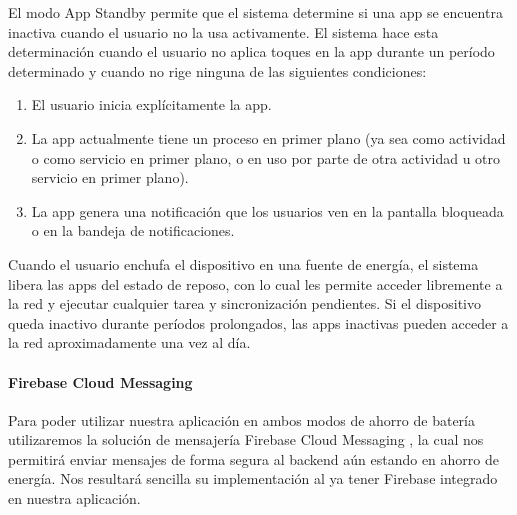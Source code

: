 El modo App Standby permite que el sistema determine si una app se encuentra inactiva cuando el usuario no la usa activamente. El sistema hace esta determinación cuando el usuario no aplica toques en la app durante un período determinado y cuando no rige ninguna de las siguientes condiciones:
\begin{enumerate}

\item El usuario inicia explícitamente la app.
\item La app actualmente tiene un proceso en primer plano (ya sea como actividad o como servicio en primer plano, o en uso por parte de otra actividad u otro servicio en primer plano).
\item La app genera una notificación que los usuarios ven en la pantalla bloqueada o en la bandeja de notificaciones.
\end{enumerate}

Cuando el usuario enchufa el dispositivo en una fuente de energía, el sistema libera las apps del estado de reposo, con lo cual les permite acceder libremente a la red y ejecutar cualquier tarea y sincronización pendientes. Si el dispositivo queda inactivo durante períodos prolongados, las apps inactivas pueden acceder a la red aproximadamente una vez al día.

\paragraph{Firebase Cloud Messaging}

Para poder utilizar nuestra aplicación en ambos modos de ahorro de batería utilizaremos la solución de mensajería  Firebase Cloud Messaging \cite{FIREBASECLOUDMESS}, la cual nos permitirá enviar mensajes de forma segura al backend aún estando en ahorro de energía. Nos resultará sencilla su implementación al ya tener Firebase integrado en nuestra aplicación.
